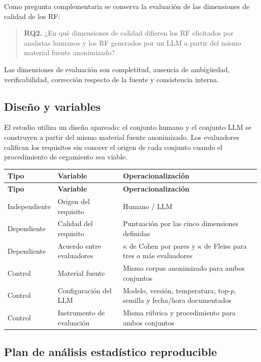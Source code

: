 \documentclass[12pt,journal,onecolumn]{IEEEtran}
\begin{document}
Como pregunta complementaria se conserva la evaluación de las dimensiones de
calidad de los RF:

\begin{quote}
\textbf{RQ2.} ¿En qué dimensiones de calidad difieren los RF elicitados por
analistas humanos y los RF generados por un LLM a partir del mismo material
fuente anonimizado?
\end{quote}

Las dimensiones de evaluación son completitud, ausencia de ambigüedad,
verificabilidad, corrección respecto de la fuente y consistencia interna.

\subsection{Diseño y variables}

El estudio utiliza un diseño apareado: el conjunto humano y el conjunto LLM se
construyen a partir del mismo material fuente anonimizado. Los evaluadores
califican los requisitos sin conocer el origen de cada conjunto cuando el
procedimiento de cegamiento sea viable.

\begin{longtable}{P{0.21\textwidth}P{0.26\textwidth}P{0.43\textwidth}}
\toprule
\textbf{Tipo} & \textbf{Variable} & \textbf{Operacionalización} \\
\midrule
\endfirsthead
\toprule
\textbf{Tipo} & \textbf{Variable} & \textbf{Operacionalización} \\
\midrule
\endhead
Independiente & Origen del requisito & Humano / LLM \\
Dependiente & Calidad del requisito & Puntuación por las cinco dimensiones definidas \\
Dependiente & Acuerdo entre evaluadores & $\kappa$ de Cohen por pares y $\kappa$ de Fleiss para tres o más evaluadores \\
Control & Material fuente & Mismo corpus anonimizado para ambos conjuntos \\
Control & Configuración del LLM & Modelo, versión, temperatura, top-$p$, semilla y fecha/hora documentados \\
Control & Instrumento de evaluación & Misma rúbrica y procedimiento para ambos conjuntos \\
\bottomrule
\end{longtable}

\subsection{Plan de análisis estadístico reproducible}
\end{document}
